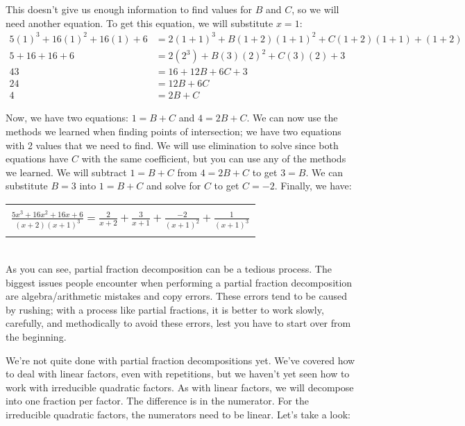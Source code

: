 {This doesn't give us enough information to find values for $B$ and $C$, so we will need another equation. To get this equation, we will substitute $x=1$:
\begin{equation*}
	\begin{split}
		5(1)^3 + 16(1)^2 + 16(1) + 6 & = 2(1+1)^3 + B(1+2)(1+1)^2 + C(1+2)(1+1) + (1+2) \\
		5+16+16+6 & = 2(2^3) + B(3)(2)^2 + C(3)(2) + 3 \\
		43 & = 16 + 12B + 6C + 3 \\
		24 & = 12B + 6C \\
		4 & = 2B + C
	\end{split}
\end{equation*}

Now, we have two equations: $1 = B+C$ and $4=2B+C$. We can now use the methods we learned when finding points of intersection; we have two equations with 2 values that we need to find. We will use elimination to solve since both equations have $C$ with the same coefficient, but you can use any of the methods we learned. We will subtract $1=B+C$ from $4=2B+C$ to get $3=B$. We can substitute $B=3$ into $1=B+C$ and solve for $C$ to get $C=-2$. Finally, we have:
	\begin{center}
		\begin{tabular}{| c |} \hline
			\\[-4pt]
			$\displaystyle \frac{5x^3+16x^2+16x+6}{(x+2)(x+1)^3} = \frac{2}{x+2} + \frac{3}{x+1} + \frac{-2}{(x+1)^2} + \frac{1}{(x+1)^3}$ \\[-4pt]
			\\\hline
		\end{tabular}
	\end{center}}\\

As you can see, partial fraction decomposition can be a tedious process. The biggest issues people encounter when performing a partial fraction decomposition are algebra/arithmetic mistakes and copy errors. These errors tend to be caused by rushing; with a process like partial fractions, it is better to work slowly, carefully, and methodically to avoid these errors, lest you have to start over from the beginning.

We're not quite done with partial fraction decompositions yet. We've covered how to deal with linear factors, even with repetitions, but we haven't yet seen how to work with irreducible quadratic factors. As with linear factors, we will decompose into one fraction per factor. The difference is in the numerator. For the irreducible quadratic factors, the numerators need to be linear. Let's take a look:

